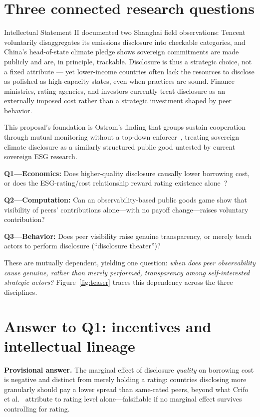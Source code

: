 \section{Three connected research questions}
Intellectual Statement II documented two Shanghai field observations: Tencent voluntarily disaggregates its emissions disclosure into checkable categories, and China's head-of-state climate pledge shows sovereign commitments are made publicly and are, in principle, trackable. Disclosure is thus a strategic choice, not a fixed attribute --- yet lower-income countries often lack the resources to disclose as polished as high-capacity states, even when practices are sound. Finance ministries, rating agencies, and investors currently treat disclosure as an externally imposed cost rather than a strategic investment shaped by peer behavior.

This proposal's foundation is Ostrom's finding that groups sustain cooperation through mutual monitoring without a top-down enforcer~\cite{ostrom1990}, treating sovereign climate disclosure as a similarly structured public good untested by current sovereign ESG research.

\textbf{Q1---Economics:} Does higher-quality disclosure causally lower borrowing cost, or does the ESG-rating/cost relationship reward rating existence alone~\cite{crifo2017}?

\textbf{Q2---Computation:} Can an observability-based public goods game show that visibility of peers' contributions alone---with no payoff change---raises voluntary contribution?

\textbf{Q3---Behavior:} Does peer visibility raise genuine transparency, or merely teach actors to perform disclosure (``disclosure theater'')?

These are mutually dependent, yielding one question: \emph{when does peer observability cause genuine, rather than merely performed, transparency among self-interested strategic actors?} Figure~\ref{fig:teaser} traces this dependency across the three disciplines.

\section{Answer to Q1: incentives and intellectual lineage}
\textbf{Provisional answer.} The marginal effect of disclosure \emph{quality} on borrowing cost is negative and distinct from merely holding a rating: countries disclosing more granularly should pay a lower spread than same-rated peers, beyond what Crifo et al.~\cite{crifo2017} attribute to rating level alone---falsifiable if no marginal effect survives controlling for rating.

